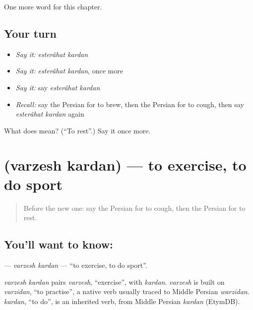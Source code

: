 \begin{grammarlens}[title={What you've built}]
One more word for this chapter.
\end{grammarlens}

\subsection*{Your turn}
\begin{itemize}
\raggedright
  \item \emph{Say it:} \emph{esterâhat kardan}
  \item \emph{Say it:} \emph{esterâhat kardan}, once more
  \item \emph{Say it:} say \emph{esterâhat kardan}
  \item \emph{Recall:} say the Persian for to brew, then the Persian for to cough, then say \emph{esterâhat kardan} again
\end{itemize}

\begin{tcolorbox}[breakable,colback=teal!4,colframe=teal!35!black,title={Before you move on}]
What does   mean? (\textquotedblleft{}To rest\textquotedblright{}.) Say it once more.
\end{tcolorbox}
\section[\texorpdfstring{\fa{ورزش} \fa{کردن} (varzesh kardan)}{ورزش کردن (varzesh kardan)}]{  (varzesh kardan) — to exercise, to do sport}

\label{lesson:FA-C218-varzesh-kardan}



\begin{quote}
Before the new one: say the Persian for to cough, then the Persian for to rest.
\end{quote}

\subsection*{You'll want to know:  }
\textbf{ } — \emph{varzesh kardan} — \textquotedblleft{}to exercise, to do sport\textquotedblright{}.

\begin{cousinweb}
\emph{varzesh kardan} pairs \emph{varzesh}, \textquotedblleft{}exercise\textquotedblright{}, with \emph{kardan}. \emph{varzesh} is built on \emph{varzidan}, \textquotedblleft{}to practise\textquotedblright{}, a native verb usually traced to Middle Persian \emph{warzīdan}. \emph{kardan}, \textquotedblleft{}to do\textquotedblright{}, is an inherited verb, from Middle Persian \emph{kardan} (EtymDB).
\end{cousinweb}

